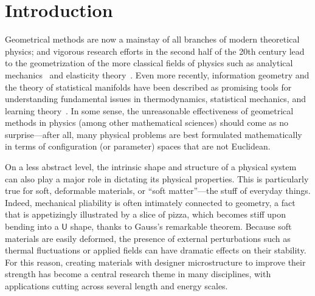 
\chapter{Introduction}


Geometrical methods are now a mainstay of all branches of modern theoretical physics;  and vigorous research efforts in the second half of the 20th century lead to the geometrization of the more classical fields of physics such as analytical mechanics~\cite{sudarshan1974,arnold1978,souder2017} and elasticity theory~\cite{marsden1994,audoly2010}.
Even more recently, information geometry and the theory of statistical manifolds have been described as promising tools for understanding fundamental issues in thermodynamics, statistical mechanics, and learning theory~\cite{ruppeiner1995}.
In some sense, the unreasonable effectiveness of geometrical methods in physics (among other mathematical sciences) should come as no surprise---after all, many physical problems are best formulated mathematically in terms of configuration (or parameter) spaces that are not Euclidean.

On a less abstract level, the intrinsic shape and structure of a physical system can also play a major role in dictating its physical properties.
This is particularly true for soft, deformable materials, or ``soft matter''---the stuff of everyday things.
Indeed, mechanical pliability is often intimately connected to geometry, a fact that is appetizingly illustrated by a slice of pizza, which becomes stiff upon bending into a $\textsf{U}$ shape, thanks to Gauss's remarkable theorem.
Because soft materials are easily deformed, the presence of external perturbations such as thermal fluctuations or applied fields can have dramatic effects on their stability.
For this reason, creating materials with designer microstructure to improve their strength has become a central research theme in many disciplines, with applications cutting across several length and energy scales.

